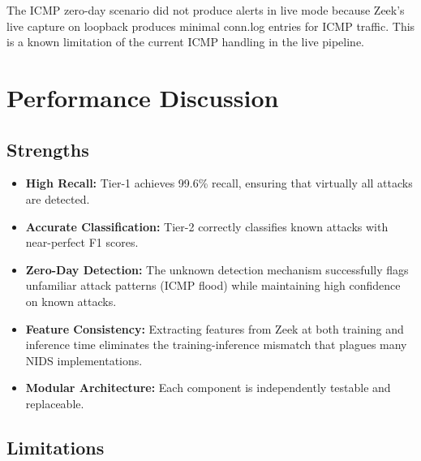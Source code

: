 \documentclass[12pt,a4paper,twoside]{report}
\begin{document}
The ICMP zero-day scenario did not produce alerts in live mode because Zeek's live capture on loopback produces minimal conn.log entries for ICMP traffic. This is a known limitation of the current ICMP handling in the live pipeline.

\section{Performance Discussion}

\subsection{Strengths}

\begin{itemize}
    \item \textbf{High Recall:} Tier-1 achieves 99.6\% recall, ensuring that virtually all attacks are detected.
    \item \textbf{Accurate Classification:} Tier-2 correctly classifies known attacks with near-perfect F1 scores.
    \item \textbf{Zero-Day Detection:} The unknown detection mechanism successfully flags unfamiliar attack patterns (ICMP flood) while maintaining high confidence on known attacks.
    \item \textbf{Feature Consistency:} Extracting features from Zeek at both training and inference time eliminates the training-inference mismatch that plagues many NIDS implementations.
    \item \textbf{Modular Architecture:} Each component is independently testable and replaceable.
\end{itemize}

\subsection{Limitations}
\end{document}

